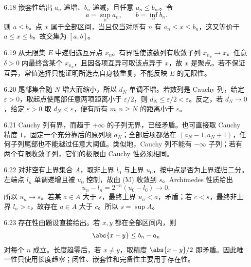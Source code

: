 \begin{solution}{6.18}
嵌套性给出 \(a_n\) 递增、\(b_n\) 递减，且任意 \(a_n\le b_m\)。令
\[
 a=\sup_n a_n,\qquad b=\inf_n b_n.
\]
则 \(a\le b\)。点 \(x\) 属于全部区间，当且仅当对所有 \(n\) 有 \(a_n\le x\le b_n\)，这又等价于 \(a\le x\le b\)。故交集为 \([a,b]\)。
\end{solution}

\begin{solution}{6.19}
从无限集 \(E\) 中递归选互异点 \(x_n\)。有界性使该数列有收敛子列 \(x_{n_k}\to x\)。任意 \(\delta>0\) 内最终含某个 \(x_{n_k}\)，且因各项互异可取该点异于 \(x\)，故 \(x\) 是聚点。若不保证互异，常值选择只能证明所选点自身被重复，不能反映 \(E\) 的无限性。
\end{solution}

\begin{solution}{6.20}
尾部集合随 \(N\) 增大而缩小，所以 \(d_N\) 单调不增。若数列是 Cauchy 列，给定 \(\varepsilon>0\)，取起点使尾部任意两项距离小于 \(\varepsilon/2\)，则 \(d_N\le\varepsilon/2<\varepsilon\)。反之，若 \(d_N\to0\)，给定 \(\varepsilon>0\) 取 \(d_N<\varepsilon\)，便有所有 \(m,n\ge N\) 的距离小于 \(\varepsilon\)。
\end{solution}

\begin{solution}{6.21}
Cauchy 列有界，而趋于 \(+\infty\) 的子列无界，已经矛盾。也可直接取 Cauchy 精度 \(1\)，固定一个充分靠后的原列项 \(a_N\)；全部后项都落在 \((a_N-1,a_N+1)\)，任何子列尾部也不能越过任意大阈值。类似地，Cauchy 列不能有 \(-\infty\) 子列；若有两个有限收敛子列，它们的极限由 Cauchy 性必须相同。
\end{solution}

\begin{solution}{6.22}
对非空有上界集合 \(A\)，取非上界 \(l_0\) 与上界 \(u_0\)，按中点是否为上界递归二分。左端点 \(l_n\) 单调递增且被 \(u_0\) 控制，故由 (M) 收敛到 \(s\)。Archimedes 性质给出
\[
 u_n-l_n=2^{-n}(u_0-l_0)\to0,
\]
所以 \(u_n\to s\)。若某 \(a\in A\) 大于 \(s\)，最终上界 \(u_n<a\)，矛盾；若 \(c<s\)，最终非上界 \(l_n>c\)，故存在 \(a\in A\) 大于 \(c\)。所以 \(s=\sup A\)。
\end{solution}

\begin{solution}{6.23}
存在性由题设直接给出。若 \(x,y\) 都在全部区间内，则
\[
 \abs{x-y}\le b_n-a_n
\]
对每个 \(n\) 成立。长度趋零后，若 \(x\ne y\)，取精度 \(\abs{x-y}/2\) 即矛盾。因此唯一性只使用长度趋零；闭性、嵌套性和完备性主要用于存在性。
\end{solution}

